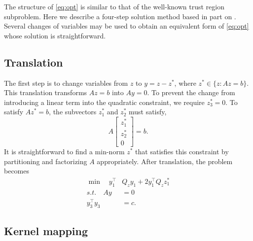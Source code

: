 \documentclass[conference]{IEEEtran}
\begin{document}


The structure of \eqref{eq:opt} is similar to that of the well-known trust region subproblem. Here we describe a four-step solution method based in part on \cite{bienstock2014}. Several changes of variables may be used to obtain an equivalent form of \eqref{eq:opt} whose solution is straightforward.

\subsection{Translation}

The first step is to change variables from $z$ to $y=z-z^*$, where
$z^*\in\{z:Az=b\}$. This translation transforms $Az=b$ into $Ay=0$. To
prevent the change from introducing a linear term into the quadratic
constraint, we require $z_3^*=0$. To satisfy $Az^*=b$, the subvectors
$z_1^*$ and $z_2^*$ must satisfy,
\[
A \begin{bmatrix} z_1^* \\ z_2^*
\\ 0 \end{bmatrix} = b.
\]
It is straightforward to find a min-norm $z^*$ that satisfies this
constraint by partitioning and factorizing $A$ appropriately. After
translation, the problem becomes
\begin{subequations}\label{opt2}
\begin{align}
\label{opt2:obj} \min\quad y_1^\top &Q_z y_1 + 2 y_1^\top Q_z z_1^* \\
\label{opt2:lin} s.t.\quad Ay &= 0 \\
\label{opt2:quad} y_3^\top y_3 &= c.
\end{align}
\end{subequations}

\subsection{Kernel mapping}
\end{document}
